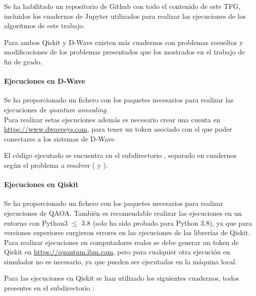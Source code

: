 Se ha habilitado un repositorio de Github\cite{codigo_tfg} con todo el contenido de este TFG, incluidos los cuadernos de Jupyter utilizados para realizar las ejecuciones de los algoritmos de este trabajo.

Para ambos Qiskit y D-Wave existen más cuadernos con problemas resueltos y modificaciones de los problemas presentados que los mostrados en el trabajo de fin de grado.

\paragraph{Ejecuciones en D-Wave}

Se ha proporcionado un fichero  con los paquetes necesarios para realizar las ejecuciones de \textit{quantum annealing}.
\\
Para realizar estas ejecuciones además es necesario crear una cuenta en \url{https://www.dwavesys.com}, para tener un token asociado con el que poder conectarse a los sistemas de D-Wave

El código ejecutado se encuentra en el subdirectorio , separado en cuadernos según el problema a resolver ( y ).

\paragraph{Ejecuciones en Qiskit}

Se ha proporcionado un fichero  con los paquetes necesarios para realizar ejecuciones de QAOA\@.
También es recomendable realizar las ejecuciones en un entorno con Python3 $\le$ 3.8 (solo ha sido probado para Python 3.8), ya que para versiones superiores surgieron errores en las ejecuciones de las librerías de Qiskit.
\\
Para realizar ejecuciones en computadores reales se debe generar un token de Qiskit en \url{https://quantum.ibm.com}, pero para cualquier otra ejecución en simulador no es necesario, ya que pueden ser ejecutadas en la máquina local.

Para las ejecuciones en Qiskit se han utilizado los siguientes cuadernos, todos presentes en el subdirectorio :

